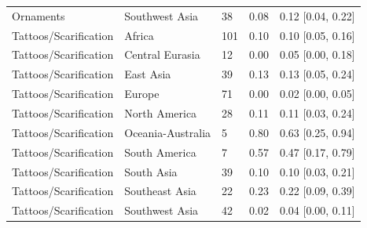 \begin{longtable}{lllll}
Ornaments & Southwest Asia & 38 & 0.08 & 0.12 [0.04, 0.22] \\
Tattoos/Scarification & Africa & 101 & 0.10 & 0.10 [0.05, 0.16] \\
Tattoos/Scarification & Central Eurasia & 12 & 0.00 & 0.05 [0.00, 0.18] \\
Tattoos/Scarification & East Asia & 39 & 0.13 & 0.13 [0.05, 0.24] \\
Tattoos/Scarification & Europe & 71 & 0.00 & 0.02 [0.00, 0.05] \\
Tattoos/Scarification & North America & 28 & 0.11 & 0.11 [0.03, 0.24] \\
Tattoos/Scarification & Oceania-Australia & 5 & 0.80 & 0.63 [0.25, 0.94] \\
Tattoos/Scarification & South America & 7 & 0.57 & 0.47 [0.17, 0.79] \\
Tattoos/Scarification & South Asia & 39 & 0.10 & 0.10 [0.03, 0.21] \\
Tattoos/Scarification & Southeast Asia & 22 & 0.23 & 0.22 [0.09, 0.39] \\
Tattoos/Scarification & Southwest Asia & 42 & 0.02 & 0.04 [0.00, 0.11] \\
\end{longtable}